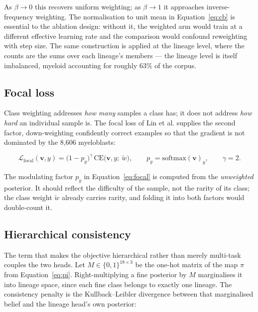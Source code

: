 \documentclass[11pt,a4paper]{article}
\begin{document}
As $\beta \rightarrow 0$ this recovers uniform weighting; as $\beta \rightarrow 1$
it approaches inverse-frequency weighting. The normalisation to unit mean in
Equation~\eqref{eq:cb} is essential to the ablation design: without it, the
weighted arm would train at a different effective learning rate and the
comparison would confound reweighting with step size. The same construction is
applied at the lineage level, where the counts are the sums over each lineage's
members --- the lineage level is itself imbalanced, myeloid accounting for
roughly 63\% of the corpus.

\subsection{Focal loss}

Class weighting addresses \emph{how many} samples a class has; it does not
address \emph{how hard} an individual sample is. The focal loss of Lin et al.
supplies the second factor, down-weighting confidently correct examples so that
the gradient is not dominated by the 8{,}606 myeloblasts:

\begin{equation}
  \mathcal{L}_{\text{focal}}(\mathbf{v}, y)
    = \bigl(1 - p_y\bigr)^{\gamma}\,
      \mathrm{CE}\bigl(\mathbf{v}, y;\ \tilde{w}\bigr),
  \qquad
  p_y = \mathrm{softmax}(\mathbf{v})_y,
  \qquad \gamma = 2.
  \label{eq:focal}
\end{equation}

The modulating factor $p_y$ in Equation~\eqref{eq:focal} is computed from the
\emph{unweighted} posterior. It should reflect the difficulty of the sample, not
the rarity of its class; the class weight $\tilde{w}$ already carries rarity, and
folding it into both factors would double-count it.

\subsection{Hierarchical consistency}

The term that makes the objective hierarchical rather than merely multi-task
couples the two heads. Let $M \in \{0,1\}^{18 \times 3}$ be the one-hot matrix
of the map $\pi$ from Equation~\eqref{eq:pi}. Right-multiplying a fine posterior
by $M$ marginalises it into lineage space, since each fine class belongs to
exactly one lineage. The consistency penalty is the Kullback--Leibler divergence
between that marginalised belief and the lineage head's own posterior:
\end{document}
